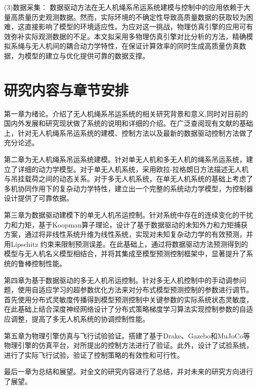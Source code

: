 \documentclass[lang=chs, degree=master, blindreview=false, winfonts=true]{yanputhesis}
\begin{document}
(3)数据采集：
数据驱动方法在无人机绳系吊运系统建模与控制中的应用依赖于大量高质量历史观测数据。然而，实际环境的不确定性导致高质量数据的获取较为困难，这直接影响了模型的环境适应性。为应对这一挑战，物理仿真引擎的应用可有效弥补实际观测数据的不足。本文拟采用多物理仿真引擎对比分析的方法，精确模拟系绳与无人机间的耦合动力学特性，在保证计算效率的同时生成高质量仿真数据，为模型的建立与优化提供可靠的数据支撑。

\section{研究内容与章节安排}

第一章为绪论。介绍了无人机绳系吊运系统的相关研究背景和意义,同时对目前的国内外发展和研究现状做了系统的说明和详细的介绍。在广泛查阅现有文献的基础上，针对无人机绳系吊运系统的建模、控制方法以及最新的数据驱动控制方法做了充分论述。

第二章为无人机绳系吊运系统建模。针对单无人机和多无人机的绳系吊运系统，建立了详细的动力学模型。对于单无人机系统，采用欧拉-拉格朗日方法描述无人机与吊挂载荷之间的动态关系。对于多无人机系统，在单无人机系统的基础上考虑了多机协同作用下的复杂动力学特性，建立出一个完整的系统动力学模型，为控制器设计提供了可靠依据。 

第三章为数据驱动建模下的单无人机吊运控制。针对系统中存在的连续变化的干扰力和力矩，基于Koopman算子理论，设计了基于数据驱动的未知外力和力矩捕获方案，通过将非线性系统升维为线性系统，实现对未知复杂动力学的有效预测，并用Lipschitz 约束来限制预测误差。在此基础上，通过将数据驱动方法预测得到的模型与无人机名义模型相结合，并将其集成至模型预测控制框架中，显著提升了系统的鲁棒控制性能。

第四章为基于数据驱动的多无人机吊运控制。针对多无人机控制中的手动调参问题，使用自适应学习的超参数优化方法来对分布式模型预测控制的参数进行调节。首先使用分布式灵敏度传播得到模型预测控制中关键参数的实际系统状态灵敏度，在此基础上结合深度神经网络设计了分布式策略梯度学习算法实现控制参数的自适应调整，提高了多无人机系统的协调控制性能。

第五章为物理引擎仿真与飞行试验验证。搭建了基于Drake、Gazebo和MuJoCo等物理引擎的仿真平台，对所提出的控制方法进行了验证。此外，设计了试验系统，进行了实际飞行试验，验证了控制策略的有效性和可行性。

最后一章为总结和展望。对全文的研究内容进行了总结，并对未来的研究方向进行了展望。
\end{document}
